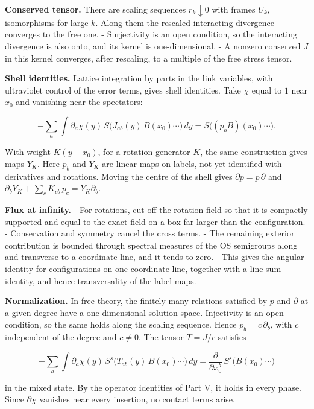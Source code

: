 \documentclass[
  letterpaper,
  11pt]{article}
\begin{document}
\textbf{Conserved tensor.} There are scaling sequences
\(r_k\downarrow0\) with frames \(U_k\), isomorphisms for large \(k\).
Along them the rescaled interacting divergence converges to the free
one. - Surjectivity is an open condition, so the interacting divergence
is also onto, and its kernel is one-dimensional. - A nonzero conserved
\(J\) in this kernel converges, after rescaling, to a multiple of the
free stress tensor.

\textbf{Shell identities.} Lattice integration by parts in the link
variables, with ultraviolet control of the error terms, gives shell
identities. Take \(\chi\) equal to \(1\) near \(x_0\) and vanishing near
the spectators:

\[-\sum_a\int\partial_a\chi(y)\,S\big(J_{ab}(y)\,B(x_0)\cdots\big)\,dy=S\big((p_bB)(x_0)\cdots\big).\]

With weight \(K(y-x_0)\), for a rotation generator \(K\), the same
construction gives maps \(Y_K\). Here \(p_b\) and \(Y_K\) are linear
maps on labels, not yet identified with derivatives and rotations.
Moving the centre of the shell gives \(\partial p=p\,\partial\) and
\(\partial_bY_K+\sum_cK_{cb}\,p_c=Y_K\partial_b\).

\textbf{Flux at infinity.} - For rotations, cut off the rotation field
so that it is compactly supported and equal to the exact field on a box
far larger than the configuration. - Conservation and symmetry cancel
the cross terms. - The remaining exterior contribution is bounded
through spectral measures of the OS semigroups along and transverse to a
coordinate line, and it tends to zero. - This gives the angular identity
for configurations on one coordinate line, together with a line-sum
identity, and hence transversality of the label maps.

\textbf{Normalization.} In free theory, the finitely many relations
satisfied by \(p\) and \(\partial\) at a given degree have a
one-dimensional solution space. Injectivity is an open condition, so the
same holds along the scaling sequence. Hence \(p_b=c\,\partial_b\), with
\(c\) independent of the degree and \(c\ne0\). The tensor \(T=J/c\)
satisfies

\[-\sum_a\int\partial_a\chi(y)\,S^s\big(T_{ab}(y)\,B(x_0)\cdots\big)\,dy=\frac{\partial}{\partial x_0^b}\,S^s\big(B(x_0)\cdots\big)\]

in the mixed state. By the operator identities of Part V, it holds in
every phase. Since \(\partial\chi\) vanishes near every insertion, no
contact terms arise.
\end{document}
